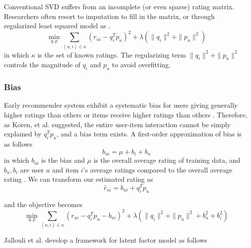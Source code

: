 \documentclass[letter paper, 11pt]{article}
\begin{document}
	
	Conventional SVD suffers from an incomplete (or even sparse) rating matrix. Researchers often resort to imputation to fill in the matrix, or through regularized least squared model as \cite{MFinRS}.
	\begin{equation}
		\min_{q, p} \sum_{(u, i) \in \kappa} (r_{ui} - q_i^T p_u)^2 + \lambda(\|q_i\|^2 + \|p_u\|^2)
	\end{equation}
	in which $\kappa$ is the set of known ratings. The regularizing term $\|q_i\|^2 + \|p_u\|^2$ controls the magnitude of $q_i$ and $p_u$ to avoid overfitting.
	
	\subsubsection{Bias}
	Early recommender system exhibit a systematic bias for users giving generally higher ratings than others or items receive higher ratings than others \cite{MFinRS}. Therefore, as Koren, et al. suggested, the entire user-item interaction cannot be simply explained by $q_i^T  p_u$, and a bias term exists. A first-order approximation of bias is as follows \cite{MFinRS}
	\begin{equation}
		b_{ui} = \mu + b_i + b_u
	\end{equation}
	in which $b_{ui}$ is the bias and $\mu$ is the overall average rating of training data, and $b_u, b_i$ are user $u$ and item $i$'s average ratings compared to the overall average rating \cite{MFinRS}. We can transform our estimated rating as 
	\begin{equation}
		\hat{r}_{ui} = b_{ui} + q_i^T  p_u 
	\end{equation}
	
	and the objective becomes
	\begin{equation}
		\min_{q, p} \sum_{(u, i) \in \kappa} (r_{ui} - q_i^T p_u - b_{ui})^2 + \lambda(\|q_i\|^2 + \|p_u\|^2 + b_u^2 + b_i^2)
	\end{equation}
	
	Jallouli et al. develop a framework for latent factor model \cite{latentFactor-RS} as follows
	
\end{document}
